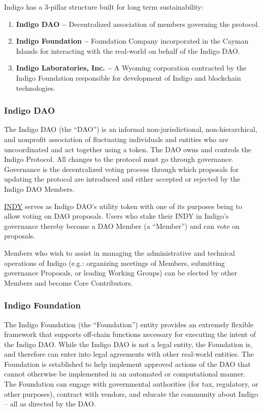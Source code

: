 \documentclass{article}
\begin{document}
\begin{sloppypar}
Indigo has a 3-pillar structure built for long term sustainability:

\begin{enumerate}
\item
  \textbf{Indigo DAO --} Decentralized association of members governing
  the protocol.
\item
  \textbf{Indigo Foundation --} Foundation Company incorporated in the
  Cayman Islands for interacting with the real-world on behalf of the
  Indigo DAO.
\item
  \textbf{Indigo Laboratories, Inc. --} A Wyoming corporation contracted
  by the Indigo Foundation responsible for development of Indigo and
  blockchain technologies.
\end{enumerate}

\hypertarget{indigo-dao}{%
\subsubsection{Indigo DAO}\label{indigo-dao}}

The Indigo DAO (the ``DAO'') is an informal non-jurisdictional,
non-hierarchical, and nonprofit association of fluctuating individuals
and entities who are uncoordinated and act together using a token. The
DAO owns and controls the Indigo Protocol. All changes to the protocol
must go through governance. Governance is the decentralized voting
process through which proposals for updating the protocol are introduced
and either accepted or rejected by the Indigo DAO Members.

\protect\hyperlink{indy}{INDY} serves as Indigo DAO's utility token with
one of its purposes being to allow voting on DAO proposals. Users who
stake their INDY in Indigo's governance thereby become a DAO Member (a
``Member'') and can vote on proposals.

Members who wish to assist in managing the administrative and technical
operations of Indigo (e.g.: organizing meetings of Members, submitting
governance Proposals, or leading Working Groups) can be elected by other
Members and become Core Contributors.

\hypertarget{indigo-foundation}{%
\subsubsection{Indigo Foundation}\label{indigo-foundation}}

The Indigo Foundation (the ``Foundation'') entity provides an extremely
flexible framework that supports off-chain functions necessary for
executing the intent of the Indigo DAO. While the Indigo DAO is not a
legal entity, the Foundation is, and therefore can enter into legal
agreements with other real-world entities. The Foundation is established
to help implement approved actions of the DAO that cannot otherwise be
implemented in an automated or computational manner. The Foundation can
engage with governmental authorities (for tax, regulatory, or other
purposes), contract with vendors, and educate the community about Indigo
-- all as directed by the DAO.


\end{sloppypar}
\end{document}
